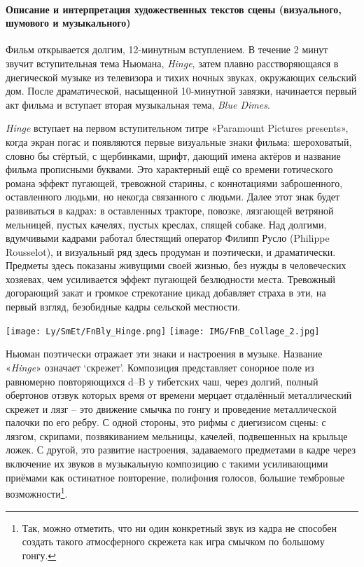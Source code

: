 \paragraph{Описание и интерпретация художественных текстов сцены (визуального, шумового и музыкального)}\label{ux43eux43fux438ux441ux430ux43dux438ux435-ux438-ux438ux43dux442ux435ux440ux43fux440ux435ux442ux430ux446ux438ux44f-ux445ux443ux434ux43eux436ux435ux441ux442ux432ux435ux43dux43dux44bux445-ux442ux435ux43aux441ux442ux43eux432-ux441ux446ux435ux43dux44b-ux432ux438ux437ux443ux430ux43bux44cux43dux43eux433ux43e-ux448ux443ux43cux43eux432ux43eux433ux43e-ux438-ux43cux443ux437ux44bux43aux430ux43bux44cux43dux43eux433ux43e-1}

Фильм открывается долгим, 12-минутным вступлением.
В течение 2 минут звучит вступительная тема Ньюмана, \emph{Hinge}, затем плавно расстворяющаяся в диегической музыке из телевизора и тихих ночных звуках, окружающих сельский дом.
После драматической, насыщенной 10-минутной завязки, начинается первый акт фильма и вступает вторая музыкальная тема, \emph{Blue Dimes}.

\emph{Hinge} вступает на первом вступительном титре «Paramount Pictures presents», когда экран погас и появляются первые визуальные знаки фильма: шероховатый, словно бы стёртый, с щербинками, шрифт, дающий имена актёров и название фильма прописными буквами.
Это характерный ещё со времени готического романа эффект пугающей, тревожной старины, с коннотациями заброшенного, оставленного людьми, но некогда связанного с людьми.
Далее этот знак будет развиваться в кадрах: в оставленных тракторе, повозке, лязгающей ветряной мельницей, пустых качелях, пустых креслах, спящей собаке.
Над долгими, вдумчивыми кадрами работал блестящий оператор Филипп Русло (Philippe Rousselot), и визуальный ряд здесь продуман и поэтически, и драматически.
Предметы здесь показаны живущими своей жизнью, без нужды в человеческих хозяевах, чем усиливается эффект пугающей безлюдности места.
Тревожный догорающий закат и громкое стрекотание цикад добавляет страха в эти, на первый взгляд, безобидные кадры сельской местности.

\texttt{[image: Ly/SmEt/FnBly\_Hinge.png]}
\texttt{[image: IMG/FnB\_Collage\_2.jpg]}

Ньюман поэтически отражает эти знаки и настроения в музыке.
Название «\emph{Hinge}» означает `скрежет'.
Композиция представляет сонорное поле из равномерно повторяющихся d--B у тибетских чаш, через долгий, полный обертонов отзвук которых время от времени мерцает отдалённый металлический скрежет и лязг -- это движение смычка по гонгу и проведение металлической палочки по его ребру.
С одной стороны, это рифмы с диегизисом сцены: с лязгом, скрипами, позвякиванием мельницы, качелей, подвешенных на крыльце ложек.
С другой, это развитие настроения, задаваемого предметами в кадре через включение их звуков в музыкальную композицию с такими усиливающими приёмами как остинатное повторение, полифония голосов, большие тембровые возможности\footnote{Так, можно отметить, что ни один конкретный звук из кадра не способен создать такого атмосферного скрежета как игра смычком по большому гонгу.}.

